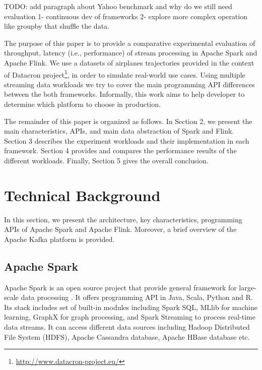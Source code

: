\documentclass[]{article}
\begin{document}
\par TODO: add paragraph about Yahoo benchmark and why do we still need evaluation 1- continuous dev of frameworks 2- explore more complex operation like groupby that shuffle the data.
\par The purpose of this paper is to provide a comparative experimental evaluation of throughput, latency (i.e., performance) of stream processing in Apache Spark and Apache Flink. We use a datasets of airplanes trajectories provided in the context of Datacron project\footnote{\url{http://www.datacron-project.eu/}}, in order to simulate real-world use cases. Using multiple streaming data workloads we try to cover the main programming API differences between the both frameworks. Informally,  this work aims to help developer to determine which platform to choose in production. 


\par The remainder of this paper is organized as follows.
In Section 2, we present the main characteristics, APIs, and main data abstraction of Spark and Flink. Section 3  describes the experiment workloads and their implementation in each framework. Section 4
provides and compares the performance results of the different workloads. Finally, Section 5 gives the overall conclusion.

\section{Technical Background}
 In this section, we present the architecture, key characteristics, programming APIs  of Apache Spark and Apache Flink. Moreover, a brief overview of the Apache Kafka platform is  provided.

\subsection{Apache Spark}

\par Apache Spark is an open source project that provide general framework for large-scale data processing \cite{spark}. It offers programming API in Java, Scala, Python and R. Its stack includes set of built-in modules including Spark SQL, MLlib for machine learning, GraphX for graph processing, and Spark Streaming to process real-time data streams. It can access different data sources including Hadoop Distributed File System (HDFS), Apache Cassandra database, Apache HBase database etc.
\end{document}

